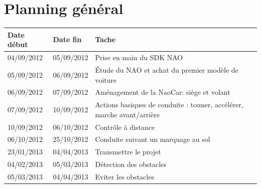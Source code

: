 \documentclass[11pt]{report} %
\begin{document}
	\section{Planning général}
		\begin{tabular}{|l|l|l|}
			\hline
			Date début & Date fin & Tache\\ \hline
			04/09/2012 & 05/09/2012 & Prise en main du SDK NAO\\ \hline
			05/09/2012 & 06/09/2012 & Étude du NAO et achat du premier modèle de voiture\\ \hline
			06/09/2012 & 07/09/2012 & Aménagement de la NaoCar: siège et volant\\ \hline
			07/09/2012 & 10/09/2012 & Actions basiques de conduite : touner, accélérer, marche avant/arrière\\ \hline
			10/09/2012 & 06/10/2012 & Contrôle à distance\\ \hline
			06/10/2012 & 25/10/2012 & Conduite suivant un marquage au sol\\ \hline
			23/01/2013 & 04/04/2013 & Transmettre le projet\\ \hline
			04/02/2013 & 05/03/2013 & Détection des obstacles\\ \hline
			05/03/2013 & 04/04/2013 & Eviter les obstacles\\ \hline
			\end{tabular}
\end{document}
